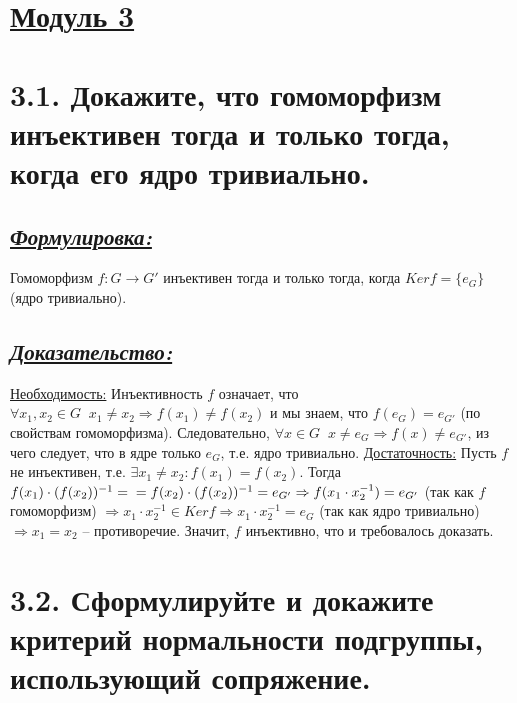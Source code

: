 \documentclass{article}
\begin{document}
\newpage
{}
\section*{\LARGE\centering \underline{Модуль 3}}

\section*{\LARGE 3.1. Докажите, что гомоморфизм инъективен тогда и только тогда, когда его ядро тривиально. }
\subsection*{\Large \underline{\textit{Формулировка: }}}
Гомоморфизм $f : G \rightarrow G'$ инъективен тогда и только тогда, когда $Kerf = \{e_G\}$ (ядро тривиально).

\subsection*{\Large \underline{\textit{Доказательство: }}}

$ $\indent\underline{Необходимость:}
\newline Инъективность $f$ означает, что $\forall x_1, x_2 \in G \;\; x_1 \ne x_2 \Rightarrow f(x_1) \ne f(x_2)$ и мы знаем, что $f(e_G) = e_{G'}$ (по свойствам гомоморфизма). Следовательно, \newline $\forall x \in G \;\; x \ne e_G \Rightarrow f(x) \ne e_{G'}$, из чего следует, что в ядре только $e_G$, т.е. ядро тривиально.
\newline \indent \underline{Достаточность:}
\newline Пусть $f$ не инъективен, т.е. $\exists x_1 \ne x_2 : f(x_1) = f(x_2)$. Тогда $f(x_1) \cdot (f(x_2))^{-1} = 
\newline = f(x_2) \cdot (f(x_2))^{-1} = e_{G'} \Rightarrow f(x_1 \cdot x_2^{-1}) = e_{G'}$ (так как $f$ гомоморфизм) $\Rightarrow x_1\cdot x_2^{-1} \in Kerf \Rightarrow x_1\cdot x_2^{-1} = e_{G}$ (так как ядро тривиально) $\Rightarrow x_1 = x_2$ -- противоречие. Значит, $f$ инъективно, что и требовалось доказать.

\section*{\LARGE 3.2. Сформулируйте и докажите критерий нормальности подгруппы, использующий сопряжение. }
\end{document}
